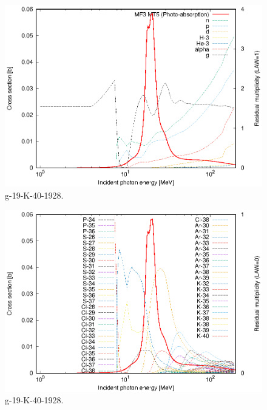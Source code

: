 \begin{figure}
 \includegraphics[width=\linewidth]{eps/g_19-K-40_1928.eps}
  \caption{g-19-K-40-1928.}
\end{figure}
\begin{figure}
 \includegraphics[width=\linewidth]{eps-law0/g_19-K-40_1928.eps}
 \caption{g-19-K-40-1928.}
\end{figure}
\newpage \clearpage

